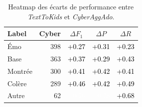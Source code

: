 \begin{table}[htbp]
  \centering
  \small
  \setlength{\tabcolsep}{4pt}
  \begin{tabular}{lrccc}
    \toprule
    \textbf{Label} & \textbf{Cyber} & \textbf{$\Delta F_1$} & \textbf{$\Delta P$} & \textbf{$\Delta R$} \\
    \midrule
    Émo & 398 & \cellcolor[HTML]{C7EA97}\textcolor{black}{+0.27} & \cellcolor[HTML]{D0EB8E}\textcolor{black}{+0.31} & \cellcolor[HTML]{C0EAA2}\textcolor{black}{+0.23} \\
    Base & 363 & \cellcolor[HTML]{E4EC7F}\textcolor{black}{+0.37} & \cellcolor[HTML]{CBEA92}\textcolor{black}{+0.29} & \cellcolor[HTML]{EEDC6F}\textcolor{black}{+0.43} \\
    Montrée & 300 & \cellcolor[HTML]{EEE172}\textcolor{black}{+0.41} & \cellcolor[HTML]{EEDF71}\textcolor{black}{+0.42} & \cellcolor[HTML]{EEE373}\textcolor{black}{+0.41} \\
    Colère & 289 & \cellcolor[HTML]{F0CB66}\textcolor{black}{+0.46} & \cellcolor[HTML]{EEDD6F}\textcolor{black}{+0.42} & \cellcolor[HTML]{F1BA5D}\textcolor{black}{+0.49} \\
    Autre & 62 & \cellcolor[HTML]{E4602C}\textcolor{white}{+0.76} & \cellcolor[HTML]{E25727}\textcolor{white}{+0.78} & \cellcolor[HTML]{E97B39}\textcolor{black}{+0.68} \\
    \bottomrule
  \end{tabular}
  \caption{Heatmap des écarts de performance entre \textit{TextToKids} et \textit{CyberAggAdo}.}
  \label{tab:heatmap-compact}
\end{table}

